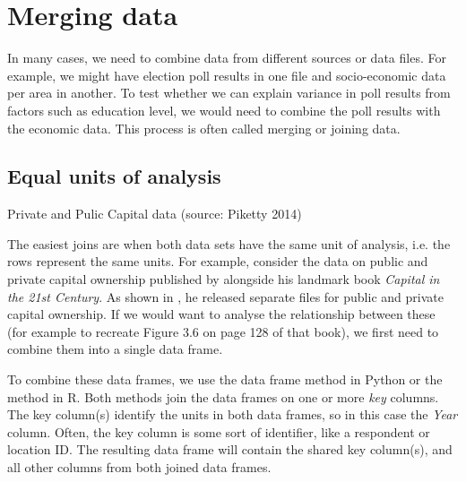 \section{Merging data}
\label{sec:join}

In many cases, we need to combine data from different sources or data files.
For example, we might have election poll results in one file and socio-economic data per area in another.
To test whether we can explain variance in poll results from factors such as education level,
we would need to combine the poll results with the economic data.
This process is often called merging or joining data.

\subsection{Equal units of analysis}


\begin{ccsexample}
\caption{Private and Pulic Capital data (source: Piketty 2014)}\label{ex:piketty}
\end{ccsexample}


The easiest joins are when both data sets have the same unit of analysis,
i.e. the rows represent the same units.
For example, consider the data on public and private capital ownership published by
\cite{piketty} alongside his landmark book \emph{Capital in the 21st Century}.
As shown in , he released separate files for public and private capital ownership.
If we would want to analyse the relationship between these (for example to recreate Figure 3.6 on page 128 of that book),
we first need to combine them into a single data frame.

To combine these data frames, we use the  data frame method  in Python or the  method  in R.
Both methods join the data frames on one or more \emph{key} columns.
The key column(s) identify the units in both data frames, so in this case the \emph{Year} column.
Often, the key column is some sort of identifier, like a respondent or location ID.
The resulting data frame will contain the shared key column(s), and all other columns from both joined data frames.

